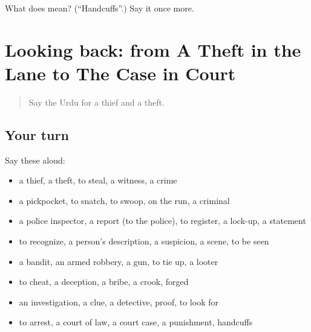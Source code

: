 \begin{tcolorbox}[breakable,colback=teal!4,colframe=teal!35!black,title={Before you move on}]
What does  mean? (\textquotedblleft{}Handcuffs\textquotedblright{}.) Say it once more.
\end{tcolorbox}
\section[(dialogue)]{Looking back: from A Theft in the Lane to The Case in Court}

\label{lesson:UR-R283-review-276-283}



\begin{quote}
Say the Urdu for a thief and a theft.
\end{quote}

\subsection*{Your turn}
Say these aloud:

\begin{itemize}
\raggedright
  \item a thief, a theft, to steal, a witness, a crime
  \item a pickpocket, to snatch, to swoop, on the run, a criminal
  \item a police inspector, a report (to the police), to register, a lock-up, a statement
  \item to recognize, a person's description, a suspicion, a scene, to be seen
  \item a bandit, an armed robbery, a gun, to tie up, a looter
  \item to cheat, a deception, a bribe, a crook, forged
  \item an investigation, a clue, a detective, proof, to look for
  \item to arrest, a court of law, a court case, a punishment, handcuffs
\end{itemize}


